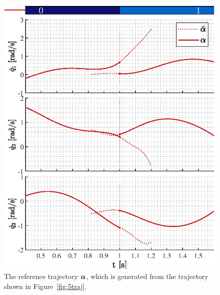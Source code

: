 \documentclass[../DC2019003Bouma.tex]{subfiles}
\begin{document}
\begin{figure}[bt!]
\begin{minipage}[c]{.48\textwidth}
\includegraphics[width=\textwidth]{alphavel.eps}
\end{minipage}
\caption{The reference trajectory $\boldsymbol{\alpha}$, which is generated from the trajectory shown in Figure~\ref{fig:5traj}.}\label{fig:5alphasim}
\centering
\begin{minipage}[c]{.48\textwidth}
\centering

\end{minipage}
\end{figure}
\end{document}
